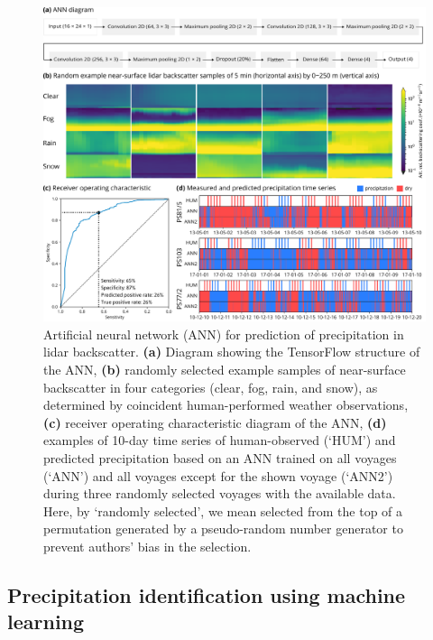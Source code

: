 \documentclass[draft]{agujournal2019}
\begin{document}
\begin{figure}[b!]
\centering
\includegraphics[width=\textwidth]{img/ann.pdf}
\caption{
Artificial neural network (ANN) for prediction of precipitation in lidar backscatter. \textbf{(a)} Diagram showing the TensorFlow structure of the ANN, \textbf{(b)} randomly selected example samples of near-surface backscatter in four categories (clear, fog, rain, and snow), as determined by coincident human-performed weather observations, \textbf{(c)} receiver operating characteristic diagram of the ANN, \textbf{(d)} examples of 10-day time series of human-observed (`HUM') and predicted precipitation based on an ANN trained on all voyages (`ANN') and all voyages except for the shown voyage (`ANN2') during three randomly selected voyages with the available data. Here, by `randomly selected', we mean selected from the top of a permutation generated by a pseudo-random number generator to prevent authors' bias in the selection.
}
\label{fig:ann}
\end{figure}

\subsection{Precipitation identification using machine learning}
\label{sec:ann}
\end{document}
